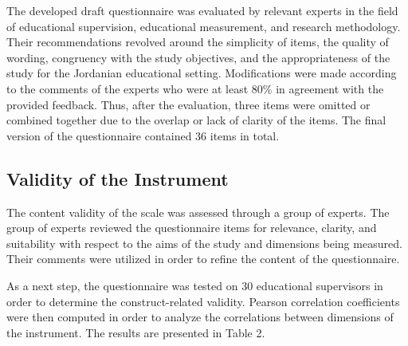 \documentclass[10pt]{NSP1}
\begin{document}
\noindent The developed draft questionnaire was evaluated by relevant experts in the field of educational supervision, educational measurement, and research methodology. Their recommendations revolved around the simplicity of items, the quality of wording, congruency with the study objectives, and the appropriateness of the study for the Jordanian educational setting. Modifications were made according to the comments of the experts who were at least 80\% in agreement with the provided feedback. Thus, after the evaluation, three items were omitted or combined together due to the overlap or lack of clarity of the items. The final version of the questionnaire contained 36 items in total.

\subsection{Validity of the Instrument}

The content validity of the scale was assessed through a group of experts. The group of experts reviewed the questionnaire items for relevance, clarity, and suitability with respect to the aims of the study and dimensions being measured. Their comments were utilized in order to refine the content of the questionnaire.

As a next step, the questionnaire was tested on 30 educational supervisors in order to determine the construct-related validity. Pearson correlation coefficients were then computed in order to analyze the correlations between dimensions of the instrument. The results are presented in Table 2.
\end{document}
